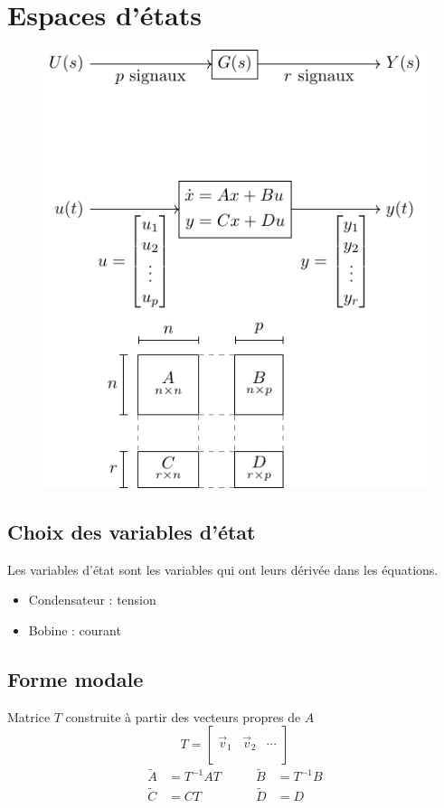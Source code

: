 \documentclass[resume]{subfiles}
\begin{document}
\section{Espaces d'états}
\begin{figure}[H]
\centering
\includegraphics[scale=1,page=1]{drwg_0.pdf}
\end{figure}
\subsection{Choix des variables d'état}
Les variables d'état sont les variables qui ont leurs dérivée dans les équations.
\begin{itemize}
\item Condensateur : tension
\item Bobine : courant
\end{itemize}

\subsection{Forme modale}
Matrice $T$ construite à partir des vecteurs propres de $A$
$$T=\begin{bmatrix}
\\
\vec{v}_1 & \vec{v}_2 & \cdots\\
\\
\end{bmatrix}$$
$$\boxed{\begin{split}
\tilde{A} &= T^{-1}AT &\qquad \tilde{B}&=T^{-1}B\\
\tilde{C} &= CT&\qquad \tilde{D}&=D\end{split}}$$
\end{document}
